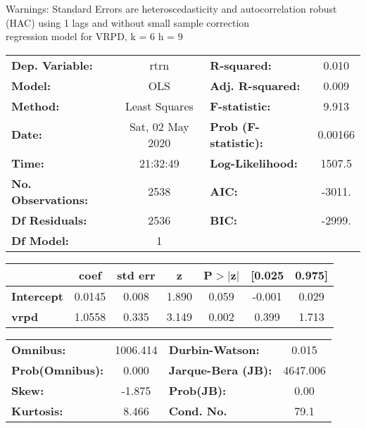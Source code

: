 Warnings: \newline
 [1] Standard Errors are heteroscedasticity and autocorrelation robust (HAC) using 1 lags and without small sample correction\\ 

regression model for VRPD, k = 6 h = 9\begin{center}
\begin{tabular}{lclc}
\toprule
\textbf{Dep. Variable:}    &       rtrn       & \textbf{  R-squared:         } &     0.010   \\
\textbf{Model:}            &       OLS        & \textbf{  Adj. R-squared:    } &     0.009   \\
\textbf{Method:}           &  Least Squares   & \textbf{  F-statistic:       } &     9.913   \\
\textbf{Date:}             & Sat, 02 May 2020 & \textbf{  Prob (F-statistic):} &  0.00166    \\
\textbf{Time:}             &     21:32:49     & \textbf{  Log-Likelihood:    } &    1507.5   \\
\textbf{No. Observations:} &        2538      & \textbf{  AIC:               } &    -3011.   \\
\textbf{Df Residuals:}     &        2536      & \textbf{  BIC:               } &    -2999.   \\
\textbf{Df Model:}         &           1      & \textbf{                     } &             \\
\bottomrule
\end{tabular}
\begin{tabular}{lcccccc}
                   & \textbf{coef} & \textbf{std err} & \textbf{z} & \textbf{P$> |$z$|$} & \textbf{[0.025} & \textbf{0.975]}  \\
\midrule
\textbf{Intercept} &       0.0145  &        0.008     &     1.890  &         0.059        &       -0.001    &        0.029     \\
\textbf{vrpd}      &       1.0558  &        0.335     &     3.149  &         0.002        &        0.399    &        1.713     \\
\bottomrule
\end{tabular}
\begin{tabular}{lclc}
\textbf{Omnibus:}       & 1006.414 & \textbf{  Durbin-Watson:     } &    0.015  \\
\textbf{Prob(Omnibus):} &   0.000  & \textbf{  Jarque-Bera (JB):  } & 4647.006  \\
\textbf{Skew:}          &  -1.875  & \textbf{  Prob(JB):          } &     0.00  \\
\textbf{Kurtosis:}      &   8.466  & \textbf{  Cond. No.          } &     79.1  \\
\bottomrule
\end{tabular}
\end{center}

